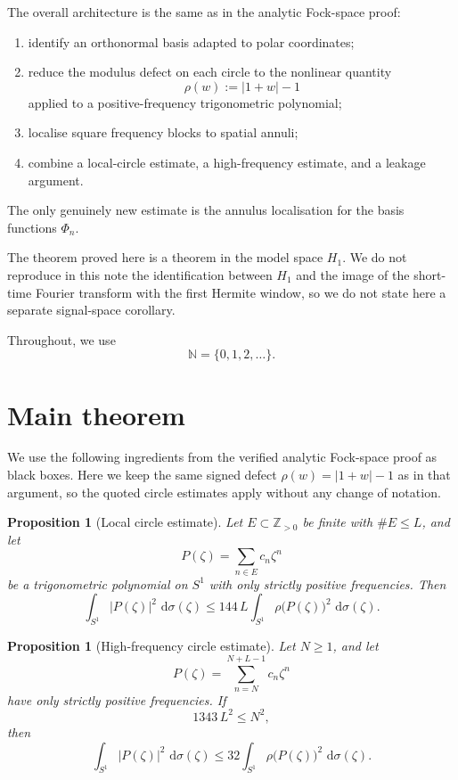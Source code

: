 \documentclass[11pt]{amsart}
\newtheorem{proposition}[theorem]{Proposition}
\theoremstyle{remark}
\newcommand{\N}{\mathbb{N}}
\newcommand{\Z}{\mathbb{Z}}
\newcommand{\abs}[1]{\lvert #1 \rvert}
\newcommand{\dd}{\,\mathrm{d}}
\newcommand{\rhoFn}{\rho}
\begin{document}
The overall architecture is the same as in the analytic Fock-space proof:
\begin{enumerate}
\item identify an orthonormal basis adapted to polar coordinates;
\item reduce the modulus defect on each circle to the nonlinear quantity
\[
\rhoFn(w) := \abs{1+w} - 1
\]
applied to a positive-frequency trigonometric polynomial;
\item localise square frequency blocks to spatial annuli;
\item combine a local-circle estimate, a high-frequency estimate, and a
leakage argument.
\end{enumerate}
The only genuinely new estimate is the annulus localisation for the basis
functions $\Phi_n$.

The theorem proved here is a theorem in the model space $H_1$. We do not
reproduce in this note the identification between $H_1$ and the image of the
short-time Fourier transform with the first Hermite window, so we do not state
here a separate signal-space corollary.

Throughout, we use
\[
\N = \{0,1,2,\dots\}.
\]

\section{Main theorem}

We use the following ingredients from the verified analytic Fock-space proof as
black boxes. Here we keep the same signed defect $\rhoFn(w)=\abs{1+w}-1$ as in
that argument, so the quoted circle estimates apply without any change of
notation.

\begin{proposition}[Local circle estimate]\label{prop:local-circle}
Let $E \subset \Z_{>0}$ be finite with $\#E \le L$, and let
\[
P(\zeta) = \sum_{n\in E} c_n \zeta^n
\]
be a trigonometric polynomial on $S^1$ with only strictly positive
frequencies. Then
\[
\int_{S^1} \abs{P(\zeta)}^2\,\dd \sigma(\zeta)
\le
144\,L \int_{S^1} \rhoFn\bigl(P(\zeta)\bigr)^2\,\dd \sigma(\zeta).
\]
\end{proposition}

\begin{proposition}[High-frequency circle estimate]\label{prop:high-circle}
Let $N \ge 1$, and let
\[
P(\zeta) = \sum_{n=N}^{N+L-1} c_n \zeta^n
\]
have only strictly positive frequencies. If
\[
1343\,L^2 \le N^2,
\]
then
\[
\int_{S^1} \abs{P(\zeta)}^2\,\dd \sigma(\zeta)
\le
32 \int_{S^1} \rhoFn\bigl(P(\zeta)\bigr)^2\,\dd \sigma(\zeta).
\]
\end{proposition}
\end{document}
